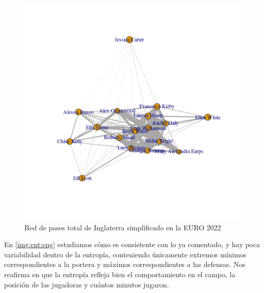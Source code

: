 \begin{figure}[h!tbp]
  \centering
   \includegraphics[width=\textwidth]{./img/plot_england_simpl.png}
   \caption{Red de pases total de Inglaterra simplificado en la EURO 2022}
   \label{img:red:simpl:eng}
\end{figure}

En \ref{img:ent:eng} estudiamos cómo es consistente con lo ya comentado, y hay poca variabilidad dentro de la 
entropía, conteniendo únicamente extremos mínimos correspondientes a la portera y máximos correspondientes a las defensas. 
Nos reafirma en que la entropía refleja bien el comportamiento en el campo, la posición de las jugadoras y cuántos 
minutos jugaron.

